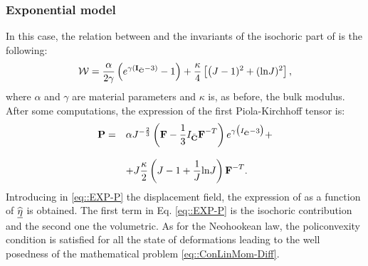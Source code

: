 \subsubsection{Exponential model} In this case, the relation between
\W and the invariants of the isochoric part of \C is the following:
\begin{equation}
  \mathcal{W}= \displaystyle
  \frac{\alpha}{2\gamma}\left(e^{\gamma(\textbf{I}_{\bar{\textbf{C}}}-3)}-1\right) +
  \frac{\kappa}{4}\left[\big(J-1)^2 + (\text{ln}J)^2\right],
  \label{eq::strainExp}
\end{equation}
where $\alpha$ and $\gamma$ are material parameters and
$\kappa$ is, as before, the bulk modulus. After some computations, the
expression of the first Piola-Kirchhoff tensor is:
\begin{equation}
  \begin{array}{lll} \textbf{P} = & \displaystyle \alpha
    J^{-\frac{2}{3}}\left(\textbf{F}-\frac{1}{3}I_{\bar{\textbf{C}}}\textbf{F}^{-T}\right)
    e^{\gamma\big(I_{\bar{\textbf{C}}}-3\big)}
    +\\ \\ & \displaystyle +
    J\frac{\kappa}{2}\left(J-1+\frac{1}{J}\text{ln}J\right)\textbf{F}^{-T}.
  \end {array}
  \label{eq::EXP-P}
\end{equation}
Introducing in \eqref{eq::EXP-P} the displacement
field, the expression of \Piola as a function of $\widehat{\underline{\eta}}$ is
obtained. The first term in Eq. \eqref{eq::EXP-P} is the isochoric
contribution and the second one the volumetric. As for the Neohookean
law, the policonvexity condition is satisfied for all the state of
deformations leading to the well posedness of the mathematical problem
\eqref{eq::ConLinMom-Diff}.
